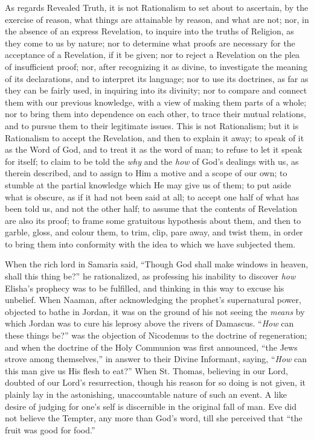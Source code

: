 As regards Revealed Truth, it is not Rationalism
to set about to ascertain, by the exercise of reason, what things are
attainable by reason, and what are not; nor, in the absence of an
express Revelation, to inquire into the truths of Religion, as they
come to us by nature; nor to determine what proofs are necessary for
the acceptance of a Revelation, if it be given; nor to reject a
Revelation on the plea of insufficient proof; nor, after recognizing
it as divine, to investigate the meaning of its declarations, and to
interpret its language; nor to use its doctrines, as far as they can
be fairly used, in inquiring into its divinity; nor to compare and
connect them with our previous knowledge, with a view of making them
parts of a whole; nor to bring them into dependence on each other, to
trace their mutual relations, and to pursue them to their legitimate
issues. This is not Rationalism; but it is Rationalism to accept the
Revelation, and then to explain it away; to speak of it as the Word of
God, and to treat it as the word of man; to refuse to let it speak for
itself; to claim to be told the \emph{why} and the \emph{how} of God's
dealings with us, as therein described, and to assign to Him a motive
and a scope of our own; to stumble at the partial knowledge which He
may give us of them; to put aside what is obscure, as if it had not
been said at all; to accept one half of what has been told us, and not
the other half; to assume that the contents of Revelation are also its
proof; to frame some gratuitous hypothesis about them, and then to
garble, gloss, and colour them, to trim, clip, pare away, and twist
them, in order to bring them into conformity with the idea to which we
have subjected them.

When the rich lord in Samaria said, ``Though God
shall make windows in heaven, shall this thing be?'' he rationalized, as professing his inability to discover \emph{how}
Elisha's prophecy was to be fulfilled, and thinking in this way to
excuse his unbelief. When Naaman, after acknowledging the prophet's
supernatural power, objected to bathe in Jordan, it was on the ground
of his not seeing the \emph{means} by which Jordan was to cure his
leprosy above the rivers of Damascus. ``\emph{How} can these things
be?'' was the objection of Nicodemus to the doctrine of regeneration;
and when the doctrine of the Holy Communion was first announced, ``the Jews strove among themselves,'' in answer to their Divine
Informant, saying, ``\emph{How} can this man give us His flesh to
eat?'' When St. Thomas, believing in our Lord, doubted of our Lord's
resurrection, though his reason for so doing is not given, it plainly
lay in the astonishing, unaccountable nature of such an event. A like
desire of judging for one's self is discernible in the original fall
of man. Eve did not believe the Tempter, any more than God's word,
till she perceived that ``the fruit was good for food.''

